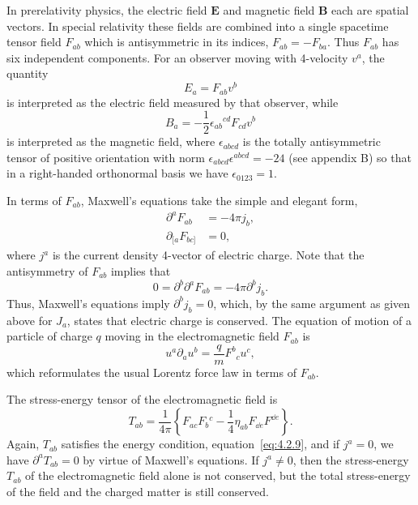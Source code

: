 In prerelativity physics, the electric field \(\mathbf{E}\) and magnetic field
\(\mathbf{B}\) each are spatial vectors. In special relativity these fields are
combined into a single spacetime tensor field \(F_{ab}\) which is antisymmetric
in its indices, \(F_{ab}=-F_{ba}\). Thus \(F_{ab}\) has six independent
components. For an observer moving with 4-velocity \(v^a\), the quantity
\begin{equation}
  E_a=F_{ab}v^b
  \tag{4.2.21}\label{eq:4.2.21}
\end{equation}
is interpreted as the electric field measured by that observer, while
\begin{equation}
  B_a=-\frac12\epsilon_{ab}{}^{cd}F_{cd}v^b
  \tag{4.2.22}\label{eq:4.2.22}
\end{equation}
is interpreted as the magnetic field, where \(\epsilon_{abcd}\) is the totally
antisymmetric tensor of positive orientation with norm
\(\epsilon_{abcd}\epsilon^{abcd}=-24\) (see appendix B) so that in a
right-handed orthonormal basis we have \(\epsilon_{0123}=1\).

In terms of \(F_{ab}\), Maxwell's equations take the simple and elegant form,
\begin{align}
  \partial^aF_{ab}&=-4\pi j_b ,
    \tag{4.2.23}\label{eq:4.2.23}\\
  \partial_{[a}F_{bc]}&=0 ,
    \tag{4.2.24}\label{eq:4.2.24}
\end{align}
where \(j^a\) is the current density 4-vector of electric charge. Note that the
antisymmetry of \(F_{ab}\) implies that
\begin{equation}
  0=\partial^b\partial^aF_{ab}=-4\pi\partial^bj_b .
  \tag{4.2.25}\label{eq:4.2.25}
\end{equation}
Thus, Maxwell's equations imply \(\partial^bj_b=0\), which, by the same
argument as given above for \(J_a\), states that electric charge is conserved. The
equation of motion of a particle of charge \(q\) moving in the electromagnetic
field \(F_{ab}\) is
\begin{equation}
  u^a\partial_au^b=\frac{q}{m}F^b{}_cu^c ,
  \tag{4.2.26}\label{eq:4.2.26}
\end{equation}
which reformulates the usual Lorentz force law in terms of \(F_{ab}\).

The stress-energy tensor of the electromagnetic field is
\begin{equation}
  T_{ab}=\frac{1}{4\pi}\left\{
  F_{ac}F_b{}^c-\frac14\eta_{ab}F_{\dd e}F^{\dd e}\right\} .
  \tag{4.2.27}\label{eq:4.2.27}
\end{equation}
Again, \(T_{ab}\) satisfies the energy condition,
equation~\eqref{eq:4.2.9}, and if \(j^a=0\), we have
\(\partial^aT_{ab}=0\) by virtue of Maxwell's equations. If \(j^a\neq0\),
then the stress-energy \(T_{ab}\) of the electromagnetic field alone is not
conserved, but the total stress-energy of the field and the charged matter is still
conserved.


